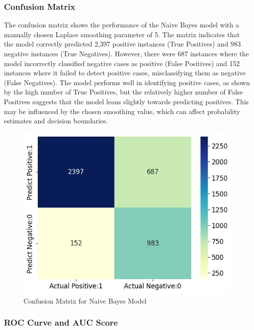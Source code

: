 \subsubsection{Confusion Matrix}
The confusion matrix shows the performance of the Naive Bayes model with a manually chosen Laplace smoothing parameter of 5. The matrix indicates that the model correctly predicted 2,397 positive instances (True Positives) and 983 negative instances (True Negatives). However, there were 687 instances where the model incorrectly classified negative cases as positive (False Positives) and 152 instances where it failed to detect positive cases, misclassifying them as negative (False Negatives). The model performs well in identifying positive cases, as shown by the high number of True Positives, but the relatively higher number of False Positives suggests that the model leans slightly towards predicting positives. This may be influenced by the chosen smoothing value, which can affect probability estimates and decision boundaries.

\begin{figure}[hbt!]
    \centering
    \includegraphics[width=1\linewidth]{Images/6.5b.jpg}
    \caption{Confusion Matrix for Naive Bayes Model}
    \label{fig:enter-label}
\end{figure}

\subsubsection{ROC Curve and AUC Score}

